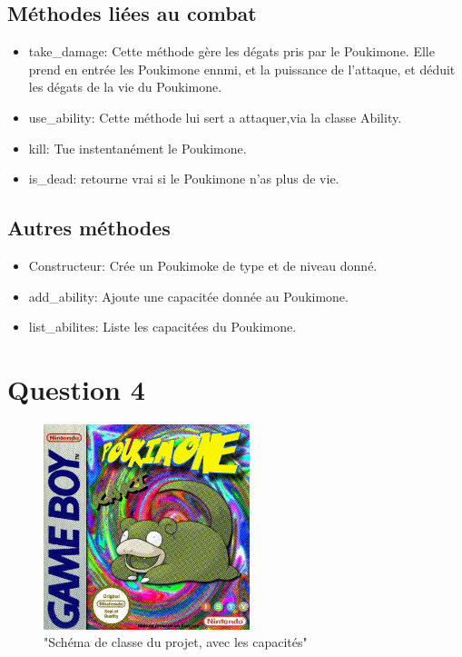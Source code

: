 \documentclass{report}
\begin{document}
\subsection*{Méthodes liées au combat}
\begin{itemize}
    \item{take\_damage:}
        Cette méthode gère les dégats pris par le Poukimone. Elle prend en entrée les Poukimone ennmi, et la puissance de l'attaque, et déduit les dégats de la vie du Poukimone.\\
    \item{use\_ability:}
        Cette méthode lui sert a attaquer,via la classe Ability.\\
    \item{kill:}
        Tue instentanément le Poukimone.\\
    \item{is\_dead:}
        retourne vrai si le Poukimone n'as plus de vie.
\end{itemize}
\subsection*{Autres méthodes}
\begin{itemize}
    \item{Constructeur:}
        Crée un Poukimoke de type et de niveau donné.\\
    \item{add\_ability:}
        Ajoute une capacitée donnée au Poukimone.\\
    \item{list\_abilites:}
        Liste les capacitées du Poukimone.
\end{itemize}
\section*{Question 4}
\begin{figure}[ht!]
    \centering
    \includegraphics[width=60mm]{cover.jpg}
    \caption{"Schéma de classe du projet, avec les capacités"}
\end{figure}
\end{document}
